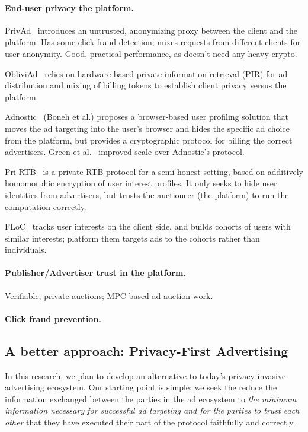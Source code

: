 \paragraph{End-user privacy \vs the platform.}
%
PrivAd~\cite{privad} introduces an untrusted, anonymizing proxy between the
client and the platform.
%
Has some click fraud detection; mixes requests from different clients for user
anonymity.
%
Good, practical performance, as doesn't need any heavy crypto.
%

%
ObliviAd~\cite{obliviad} relies on hardware-based private information retrieval
(PIR) for ad distribution and mixing of billing tokens to establish client
privacy versus the platform.
%

%
Adnostic~\cite{adnostic} (Boneh et al.) proposes a browser-based user profiling
solution that moves the ad targeting into the user's browser and hides the
specific ad choice from the platform, but provides a cryptographic protocol for
billing the correct advertisers.
%
Green et al.~\cite{adnostic+} improved scale over Adnostic's protocol.
%

Pri-RTB~\cite{pri-rtb} is a private RTB protocol for a semi-honest setting,
based on additively homomorphic encryption of user interest profiles.
%
It only seeks to hide user identities from advertisers, but trusts the
auctioneer (the platform) to run the computation correctly.
%

%
FLoC~\cite{floc} tracks user interests on the client side, and builds cohorts of
users with similar interests; platform them targets ads to the cohorts rather
than individuals.
%

\paragraph{Publisher/Advertiser trust in the platform.}

%
Verifiable, private auctions; MPC based ad auction work.
%

\paragraph{Click fraud prevention.}
%
%

\subsection{A better approach: Privacy-First Advertising}

%
In this research, we plan to develop an alternative to today's privacy-invasive
advertising ecosystem.
%
Our starting point is simple: we seek the reduce the information exchanged
between the parties in the ad ecosystem to \emph{the minimum information
necessary for successful ad targeting and for the parties to trust each other}
that they have executed their part of the protocol faithfully and correctly.
%

